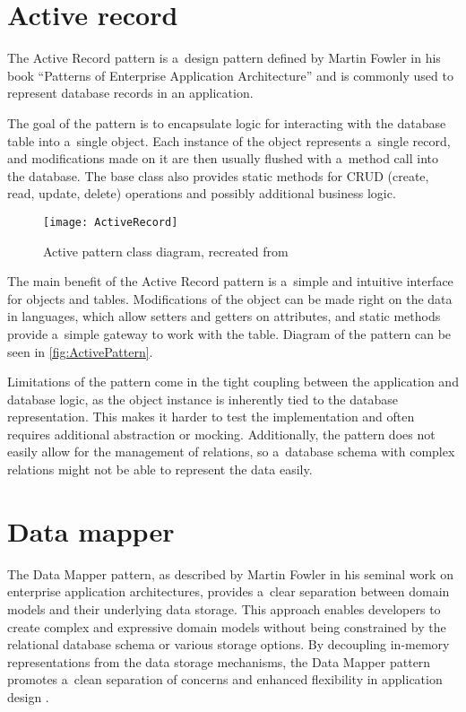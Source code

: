 \section*{Active record}

The Active Record pattern is a~design pattern defined by Martin Fowler in his
book \enquote{Patterns of Enterprise Application Architecture}
\cite[p. 160]{fowler-patterns-2003} and is commonly used to represent database
records in an application.

The goal of the pattern is to encapsulate logic for interacting with the
database table into a~single object. Each instance of the object represents
a~single record, and modifications made on it are then usually flushed with
a~method call into the database. The base class also provides static methods for
CRUD (create, read, update, delete) operations and possibly additional business
logic.  

\begin{figure}
    \caption[Active pattern class diagram]{Active pattern class diagram, recreated from \cite[Fowler]{fowler-patterns-2003}}
    \label{fig:ActivePattern}
    \centering
    \texttt{[image: ActiveRecord]}
\end{figure}

The main benefit of the Active Record pattern is a~simple and intuitive
interface for objects and tables. Modifications of the object can be made right
on the data in languages, which allow setters and getters on attributes, and
static methods provide a~simple gateway to work with the table. Diagram of the
pattern can be seen in \autoref{fig:ActivePattern}.

Limitations of the pattern come in the tight coupling between the application
and database logic, as the object instance is inherently tied to the database
representation. This makes it harder to test the implementation and often
requires additional abstraction or mocking. Additionally, the pattern does not
easily allow for the management of relations, so a~database schema with complex
relations might not be able to represent the data easily. 

\section*{Data mapper}

The Data Mapper pattern, as described by Martin Fowler in his seminal work on
enterprise application architectures, provides a~clear separation between domain
models and their underlying data storage. This approach enables developers to
create complex and expressive domain models without being constrained by the
relational database schema or various storage options. By decoupling in-memory
representations from the data storage mechanisms, the Data Mapper pattern
promotes a~clean separation of concerns and enhanced flexibility in application
design \cite[p. 165]{fowler-patterns-2003}.

